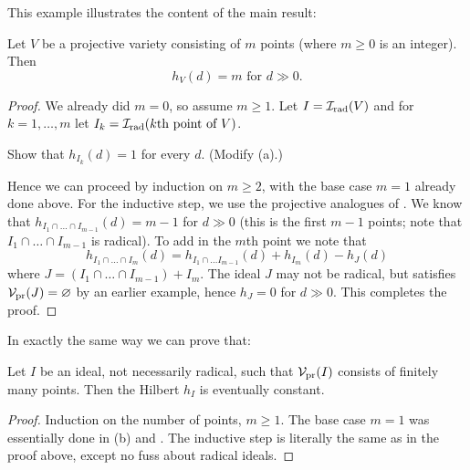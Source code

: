 This example illustrates the content of the main result:
\begin{theorem}
	Let $V$ be a projective variety consisting of $m$ points
	(where $m \ge 0$ is an integer).
	Then \[ h_V(d) = m \text{ for $d \gg 0$}. \]
\end{theorem}
\begin{proof}
	We already did $m = 0$, so assume $m \ge 1$.
	Let $I = \mathcal I_{\text{rad}}(V)$ and for $k=1,\dots,m$
	let $I_k = \mathcal I_{\text{rad}}(\text{$k$th point of $V$})$.
	\begin{ques}
		Show that $h_{I_k} (d) = 1$ for every $d$.
		(Modify (a).)
		\label{ques:hilbert_always_one}
	\end{ques}

	Hence we can proceed by induction on $m \ge 2$,
	with the base case $m=1$ already done above.
	For the inductive step,
	we use the projective analogues of .
	We know that $h_{I_1 \cap \dots \cap I_{m-1}}(d) = m-1$ for $d \gg 0$
	(this is the first $m-1$ points;
	note that $I_1 \cap \dots \cap I_{m-1}$ is radical).
	To add in the $m$th point we note that
	\[
		h_{I_1 \cap \dots \cap I_m}(d)
		= h_{I_1 \cap \dots I_{m-1}}(d) + h_{I_m}(d)
		- h_J(d)
	\]
	where $J = (I_1 \cap \dots \cap I_{m-1}) + I_m$.
	The ideal $J$ may not be radical, but satisfies $\mathcal V_{\text{pr}}(J) = \varnothing$
	by an earlier example, hence $h_J = 0$ for $d \gg 0$.
	This completes the proof.
\end{proof}
In exactly the same way we can prove that:
\begin{corollary}[$h_I$ eventually constant when $\dim \Vp(I) = 0$]
	Let $I$ be an ideal, not necessarily radical,
	such that $\mathcal V_{\text{pr}}(I)$ consists of finitely many points.
	Then the Hilbert $h_I$ is eventually constant.
\end{corollary}
\begin{proof}
	Induction on the number of points, $m \ge 1$.
	The base case $m = 1$ was essentially done in (b)
	and .
	The inductive step is literally the same as in the proof above,
	except no fuss about radical ideals.
\end{proof}

